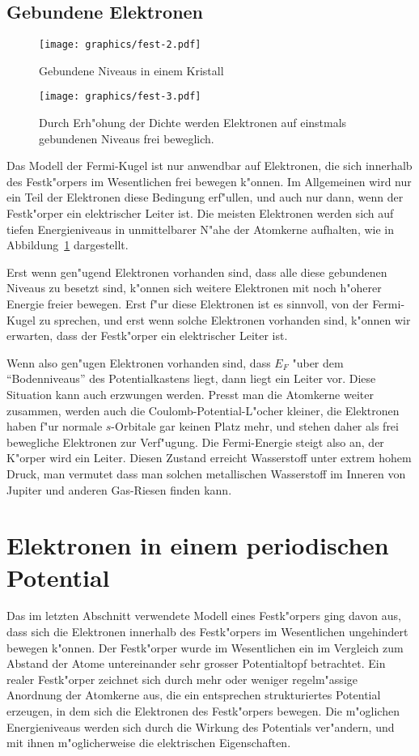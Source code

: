 \subsection{Gebundene Elektronen\label{skript:gebundeneelektronen}}
\begin{figure}
\centering
\texttt{[image: graphics/fest-2.pdf]}
\caption{Gebundene Niveaus in einem Kristall
\label{skript:gebundene-niveaus}}
\end{figure}
\begin{figure}
\centering
\texttt{[image: graphics/fest-3.pdf]}
\caption{Durch Erh"ohung der Dichte werden Elektronen auf einstmals
gebundenen Niveaus frei beweglich.
\label{skript:gebundene-niveaus-komprimiert}}
\end{figure}
Das Modell der Fermi-Kugel ist nur anwendbar auf Elektronen, die sich
innerhalb des Festk"orpers im Wesentlichen frei bewegen k"onnen.
Im Allgemeinen wird nur ein Teil der Elektronen diese Bedingung erf"ullen,
und auch nur dann, wenn der Festk"orper ein elektrischer Leiter ist.
Die meisten Elektronen werden sich auf tiefen Energieniveaus in unmittelbarer
N"ahe der Atomkerne aufhalten, wie in Abbildung~\ref{skript:gebundene-niveaus}
dargestellt.

Erst wenn gen"ugend Elektronen vorhanden sind, dass alle diese gebundenen
Niveaus zu besetzt sind, k"onnen sich weitere Elektronen mit noch h"oherer
Energie freier bewegen.
Erst f"ur diese Elektronen ist es sinnvoll, von der Fermi-Kugel zu sprechen,
und erst wenn solche Elektronen vorhanden sind, k"onnen wir erwarten,
dass der Festk"orper ein elektrischer Leiter ist.

Wenn also gen"ugen Elektronen vorhanden sind, dass $E_F$ "uber dem
``Bodenniveaus'' des Potentialkastens liegt, dann liegt ein Leiter vor.
Diese Situation kann auch erzwungen werden.
Presst man die Atomkerne weiter zusammen, werden auch die
Coulomb-Potential-L"ocher kleiner, die Elektronen haben f"ur normale
$s$-Orbitale gar keinen Platz mehr, und stehen daher als frei bewegliche
Elektronen zur Verf"ugung.
Die Fermi-Energie steigt also an, der K"orper wird ein Leiter.
Diesen Zustand erreicht Wasserstoff unter extrem hohem Druck,
man vermutet dass man solchen metallischen Wasserstoff im Inneren
von Jupiter und anderen Gas-Riesen finden kann.

\section{Elektronen in einem periodischen Potential}
Das im letzten Abschnitt verwendete Modell eines Festk"orpers ging davon aus,
dass sich die Elektronen innerhalb des Festk"orpers im Wesentlichen
ungehindert bewegen k"onnen.
Der Festk"orper wurde im Wesentlichen ein im Vergleich zum Abstand 
der Atome untereinander sehr grosser Potentialtopf betrachtet.
Ein realer Festk"orper zeichnet sich durch mehr oder weniger regelm"assige
Anordnung der Atomkerne aus, die ein entsprechen strukturiertes Potential
erzeugen, in dem sich die Elektronen des Festk"orpers bewegen.
Die m"oglichen Energieniveaus werden sich durch die Wirkung des Potentials
ver"andern, und mit ihnen m"oglicherweise die elektrischen Eigenschaften.

